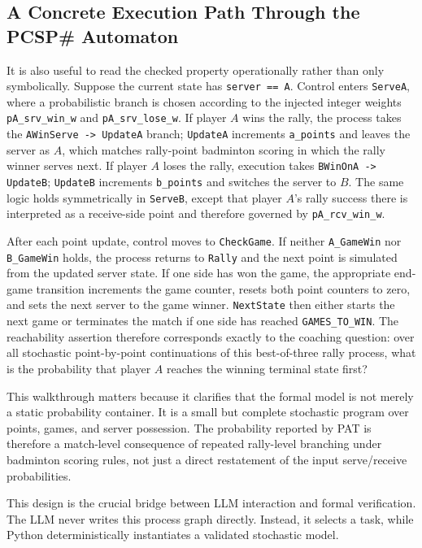 \documentclass{article}
\begin{document}
\subsection*{A Concrete Execution Path Through the PCSP\# Automaton}
It is also useful to read the checked property operationally rather than only symbolically. Suppose the current state has \texttt{server == A}. Control enters \texttt{ServeA}, where a probabilistic branch is chosen according to the injected integer weights \texttt{pA\_srv\_win\_w} and \texttt{pA\_srv\_lose\_w}. If player \(A\) wins the rally, the process takes the \texttt{AWinServe -> UpdateA} branch; \texttt{UpdateA} increments \texttt{a\_points} and leaves the server as \(A\), which matches rally-point badminton scoring in which the rally winner serves next. If player \(A\) loses the rally, execution takes \texttt{BWinOnA -> UpdateB}; \texttt{UpdateB} increments \texttt{b\_points} and switches the server to \(B\). The same logic holds symmetrically in \texttt{ServeB}, except that player \(A\)'s rally success there is interpreted as a receive-side point and therefore governed by \texttt{pA\_rcv\_win\_w}.

After each point update, control moves to \texttt{CheckGame}. If neither \texttt{A\_GameWin} nor \texttt{B\_GameWin} holds, the process returns to \texttt{Rally} and the next point is simulated from the updated server state. If one side has won the game, the appropriate end-game transition increments the game counter, resets both point counters to zero, and sets the next server to the game winner. \texttt{NextState} then either starts the next game or terminates the match if one side has reached \texttt{GAMES\_TO\_WIN}. The reachability assertion therefore corresponds exactly to the coaching question: over all stochastic point-by-point continuations of this best-of-three rally process, what is the probability that player \(A\) reaches the winning terminal state first?

This walkthrough matters because it clarifies that the formal model is not merely a static probability container. It is a small but complete stochastic program over points, games, and server possession. The probability reported by PAT is therefore a match-level consequence of repeated rally-level branching under badminton scoring rules, not just a direct restatement of the input serve/receive probabilities.

This design is the crucial bridge between LLM interaction and formal verification. The LLM never writes this process graph directly. Instead, it selects a task, while Python deterministically instantiates a validated stochastic model.
\end{document}
